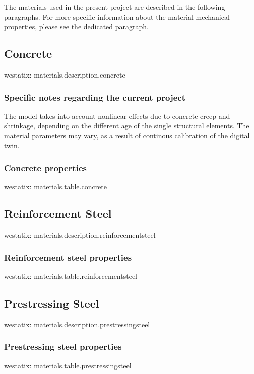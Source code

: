 %

The materials used in the present project are described in the following paragraphs.
For more specific information about the material mechanical properties, please see the dedicated paragraph.

\FloatBarrier
\needspace{.5\textheight}
\label{section_ConcreteDescription}
\subsection{Concrete}
{{westatix: materials.description.concrete}}
\FloatBarrier
\subsubsection{Specific notes regarding the current project}
The model takes into account nonlinear effects due to concrete creep and shrinkage, depending on the different age of the single structural elements. The material parameters may vary, as a result of continous calibration of the digital twin.\par
\FloatBarrier
\subsubsection{Concrete properties}
{{westatix: materials.table.concrete}}


\FloatBarrier
\newpage
\label{section_ReinforcementSteelDescription}
\subsection{Reinforcement Steel}
{{westatix: materials.description.reinforcementsteel}}
\FloatBarrier
\subsubsection{Reinforcement steel properties}
{{westatix: materials.table.reinforcementsteel}}


\FloatBarrier
\newpage
\label{section_PrestressingSteelDescription}
\subsection{Prestressing Steel}
{{westatix: materials.description.prestressingsteel}}
\subsubsection{Prestressing steel properties}
{{westatix: materials.table.prestressingsteel}}

